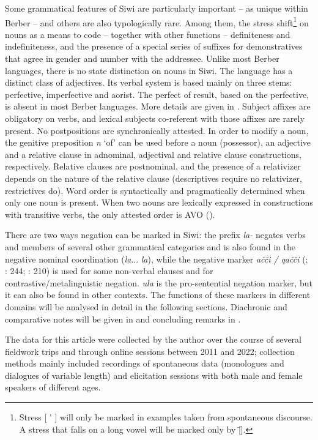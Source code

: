 \documentclass[output=paper,colorlinks,citecolor=brown]{langscibook}
\begin{document}
Some grammatical features of Siwi are particularly important – as unique within Berber – and others are also typologically rare. Among them, the stress shift\footnote{Stress [  \'{}  ] will only be marked in examples taken from spontaneous discourse. A stress that falls on a long vowel will be marked only by [\={}].} on nouns as a means to code – together with other functions – definiteness and indefiniteness, and the presence of a special series of suffixes for demonstratives that agree in gender and number with the addressee.
Unlike most Berber languages, there is no state distinction on nouns in Siwi. 
The language has a distinct class of adjectives. Its verbal system is based mainly on three stems: perfective, imperfective and aorist. The perfect of result, based on the perfective, is absent in most Berber languages. More details are given in . Subject affixes are obligatory on verbs, and lexical subjects co-referent with those affixes are rarely present. 
No postpositions are synchronically attested. In order to modify a noun, the genitive preposition \textit{n} ‘of’ can be used before a noun (possessor), an adjective and a relative clause in adnominal, adjectival and relative clause constructions, respectively. Relative clauses are postnominal, and the presence of a relativizer depends on the nature of the relative clause (descriptives require no relativizer, restrictives do). Word order is syntactically and pragmatically determined when only one noun is present. When two nouns are lexically expressed in constructions with transitive verbs, the only attested order is AVO (\citealt{MettouchiSchiattarella2018}). 

There are two ways negation can be marked in Siwi: the prefix \textit{la-} negates verbs and members of several other grammatical categories and is also found in the negative nominal coordination (\textit{la}... \textit{la}), while the negative marker \textit{ačči /} \textit{qačči} (\citealt{Laoust1931}; \citealt{Vycichl2005}: 244; \citealt{Souag2013}: 210) is used for some non-verbal clauses and for contrastive/metalinguistic negation. \textit{ula} is the pro-sentential negation marker, but it can also be found in other contexts. The functions of these markers in different domains will be analysed in detail in the following sections. Diachronic and comparative notes will be given in  and concluding remarks in . 

The data for this article were collected by the author over the course of several fieldwork trips and through online sessions between 2011 and 2022; collection methods mainly included recordings of spontaneous data (monologues and dialogues of variable length) and elicitation sessions with both male and female speakers of different ages. 
\end{document}
